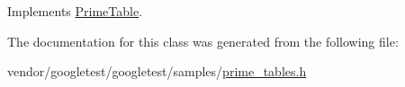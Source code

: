 Implements \hyperlink{class_prime_table_a2ab9243364ded0c51541f641b2df362a}{Prime\+Table}.



The documentation for this class was generated from the following file\+:\begin{DoxyCompactItemize}
\item 
vendor/googletest/googletest/samples/\hyperlink{prime__tables_8h}{prime\+\_\+tables.\+h}\end{DoxyCompactItemize}
